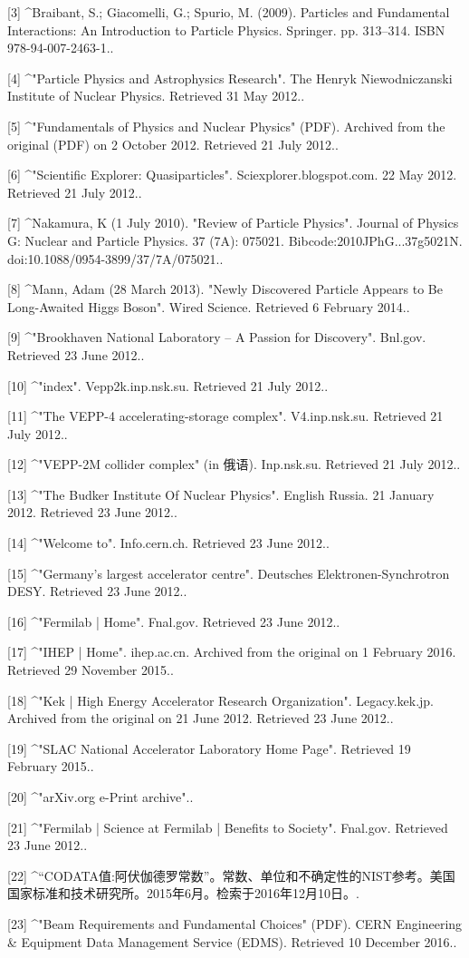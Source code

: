 [3]
^Braibant, S.; Giacomelli, G.; Spurio, M. (2009). Particles and Fundamental Interactions: An Introduction to Particle Physics. Springer. pp. 313–314. ISBN 978-94-007-2463-1..

[4]
^"Particle Physics and Astrophysics Research". The Henryk Niewodniczanski Institute of Nuclear Physics. Retrieved 31 May 2012..

[5]
^"Fundamentals of Physics and Nuclear Physics" (PDF). Archived from the original (PDF) on 2 October 2012. Retrieved 21 July 2012..

[6]
^"Scientific Explorer: Quasiparticles". Sciexplorer.blogspot.com. 22 May 2012. Retrieved 21 July 2012..

[7]
^Nakamura, K (1 July 2010). "Review of Particle Physics". Journal of Physics G: Nuclear and Particle Physics. 37 (7A): 075021. Bibcode:2010JPhG...37g5021N. doi:10.1088/0954-3899/37/7A/075021..

[8]
^Mann, Adam (28 March 2013). "Newly Discovered Particle Appears to Be Long-Awaited Higgs Boson". Wired Science. Retrieved 6 February 2014..

[9]
^"Brookhaven National Laboratory – A Passion for Discovery". Bnl.gov. 
Retrieved 23 June 2012..

[10]
^"index". Vepp2k.inp.nsk.su. Retrieved 21 July 2012..

[11]
^"The VEPP-4 accelerating-storage complex". V4.inp.nsk.su. Retrieved 21 July 2012..

[12]
^"VEPP-2M collider complex" (in 俄语). Inp.nsk.su. Retrieved 21 July 2012..

[13]
^"The Budker Institute Of Nuclear Physics". English Russia. 21 January 2012. Retrieved 23 June 2012..

[14]
^"Welcome to". Info.cern.ch. Retrieved 23 June 2012..

[15]
^"Germany's largest accelerator centre". Deutsches Elektronen-Synchrotron DESY. Retrieved 23 June 2012..

[16]
^"Fermilab | Home". Fnal.gov. Retrieved 23 June 2012..

[17]
^"IHEP | Home". ihep.ac.cn. Archived from the original on 1 February 2016. Retrieved 29 November 2015..

[18]
^"Kek | High Energy Accelerator Research Organization". Legacy.kek.jp. Archived from the original on 21 June 2012. Retrieved 23 June 2012..

[19]
^"SLAC National Accelerator Laboratory Home Page". Retrieved 19 February 2015..

[20]
^"arXiv.org e-Print archive"..

[21]
^"Fermilab | Science at Fermilab | Benefits to Society". Fnal.gov. Retrieved 23 June 2012..

[22]
^“CODATA值:阿伏伽德罗常数”。常数、单位和不确定性的NIST参考。美国国家标准和技术研究所。2015年6月。检索于2016年12月10日。.

[23]
^"Beam Requirements and Fundamental Choices" (PDF). CERN Engineering & Equipment Data Management Service (EDMS). Retrieved 10 December 2016..